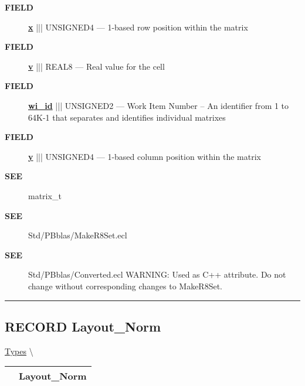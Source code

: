\par
\begin{description}
\item [\colorbox{tagtype}{\color{white} \textbf{\textsf{FIELD}}}] \textbf{\underline{x}} ||| UNSIGNED4 --- 1-based row position within the matrix
\item [\colorbox{tagtype}{\color{white} \textbf{\textsf{FIELD}}}] \textbf{\underline{v}} ||| REAL8 --- Real value for the cell
\item [\colorbox{tagtype}{\color{white} \textbf{\textsf{FIELD}}}] \textbf{\underline{wi\_id}} ||| UNSIGNED2 --- Work Item Number -- An identifier from 1 to 64K-1 that separates and identifies individual matrixes
\item [\colorbox{tagtype}{\color{white} \textbf{\textsf{FIELD}}}] \textbf{\underline{y}} ||| UNSIGNED4 --- 1-based column position within the matrix
\end{description}








\par
\begin{description}
\item [\colorbox{tagtype}{\color{white} \textbf{\textsf{SEE}}}] matrix\_t
\item [\colorbox{tagtype}{\color{white} \textbf{\textsf{SEE}}}] Std/PBblas/MakeR8Set.ecl
\item [\colorbox{tagtype}{\color{white} \textbf{\textsf{SEE}}}] Std/PBblas/Converted.ecl WARNING: Used as C++ attribute. Do not change without corresponding changes to MakeR8Set.
\end{description}



\rule{\linewidth}{0.5pt}
\subsection*{\textsf{\colorbox{headtoc}{\color{white} RECORD}
Layout\_Norm}}

\hypertarget{ecldoc:pbblas.types.layout_norm}{}
\hspace{0pt} \hyperlink{ecldoc:PBblas.Types}{Types} \textbackslash 

{\renewcommand{\arraystretch}{1.5}
\begin{tabularx}{\textwidth}{|>{\raggedright\arraybackslash}l|X|}
\hline
\hspace{0pt}\mytexttt{\color{red} } & \textbf{Layout\_Norm} \\
\hline
\end{tabularx}
}

